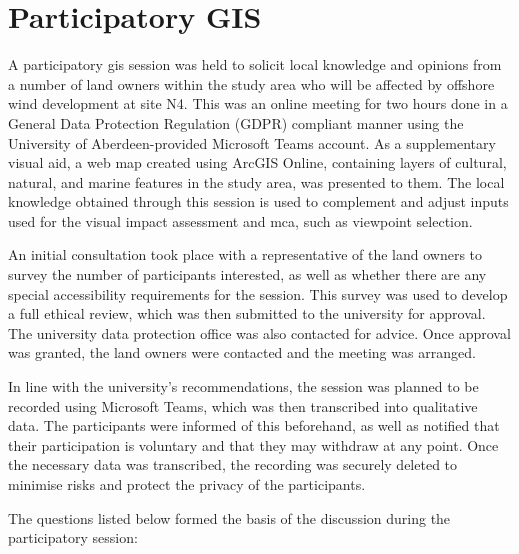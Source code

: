 \section{Participatory GIS}

A participatory \gls{gis} session was held to solicit local knowledge and opinions from a number of land owners within the study area who will be affected by offshore wind development at site N4. This was an online meeting for two hours done in a General Data Protection Regulation (GDPR) compliant manner using the University of Aberdeen-provided Microsoft Teams account. As a supplementary visual aid, a web map created using ArcGIS Online, containing layers of cultural, natural, and marine features in the study area, was presented to them. The local knowledge obtained through this session is used to complement and adjust inputs used for the visual impact assessment and \gls{mca}, such as viewpoint selection.

An initial consultation took place with a representative of the land owners to survey the number of participants interested, as well as whether there are any special accessibility requirements for the session. This survey was used to develop a full ethical review, which was then submitted to the university for approval. The university data protection office was also contacted for advice. Once approval was granted, the land owners were contacted and the meeting was arranged.

In line with the university's recommendations, the session was planned to be recorded using Microsoft Teams, which was then transcribed into qualitative data. The participants were informed of this beforehand, as well as notified that their participation is voluntary and that they may withdraw at any point. Once the necessary data was transcribed, the recording was securely deleted to minimise risks and protect the privacy of the participants.

The questions listed below formed the basis of the discussion during the participatory session:

